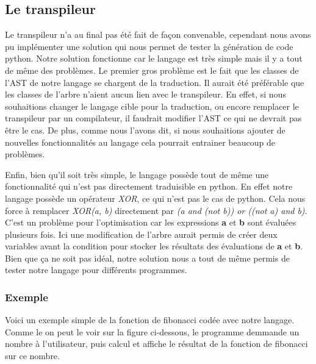 \documentclass[a4paper]{article}%
\begin{document}
\subsection{Le transpileur}

Le transpileur n'a au final pas été fait de façon convenable, cependant nous
avons pu implémenter une solution qui nous permet de tester la génération de
code python. Notre solution fonctionne car le langage est très simple mais il y
a tout de même des problèmes. Le premier gros problème est le fait que les
classes de l'AST de notre langage se chargent de la traduction. Il aurait été
préférable que les classes de l'arbre n'aient aucun lien avec le transpileur. En
effet, si nous souhaitions changer le langage cible pour la traduction, ou
encore remplacer le transpileur par un compilateur, il faudrait modifier l'AST
ce qui ne devrait pas être le cas. De plus, comme nous l'avons dit, si nous
souhaitions ajouter de nouvelles fonctionnalités au langage cela pourrait
entrainer beaucoup de problèmes.

Enfin, bien qu'il soit très simple, le langage possède tout de même une
fonctionnalité qui n'est pas directement traduisible en python. En effet notre
langage possède un opérateur \textit{XOR}, ce qui n'est pas le cas de python.
Cela nous force à remplacer \textit{XOR(a, b)} directement par \textit{(a and
(not b)) or ((not a) and b)}. C'est un problème pour l'optimisation car les
expressions \textbf{a} et \textbf{b} sont évaluées plusieurs fois. Ici une
modification de l'arbre aurait permis de créer deux variables avant la condition
pour stocker les résultats des évaluations de \textbf{a} et \textbf{b}.\\

Bien que ça ne soit pas idéal, notre solution nous a tout de même permis de
tester notre langage pour différents programmes.\\

\subsubsection*{Exemple}

Voici un exemple simple de la fonction de fibonacci codée avec notre langage.
Comme le on peut le voir sur la figure ci-dessous, le programme demmande un
nombre à l'utilisateur, puis calcul et affiche le résultat de la fonction de
fibonacci sur ce nombre.
\end{document}
